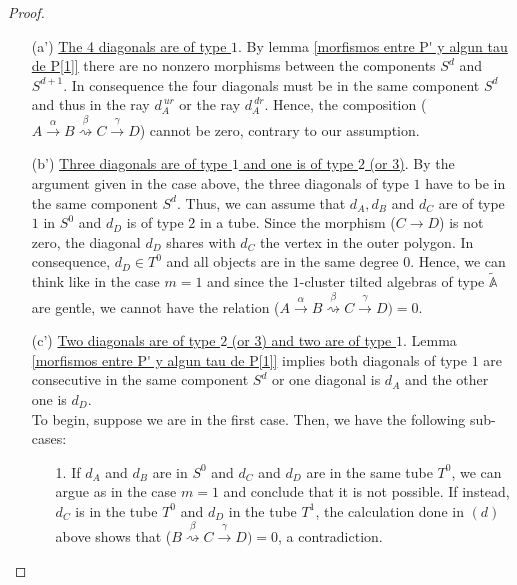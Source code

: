 \documentclass{amsart}
\theoremstyle{plain}
\theoremstyle{definition}
\begin{document}
\begin{proof}
\begin{itemize}
  \item [(a')] \underline{The 4 diagonals are of type $1$}. By lemma \ref{morfismos entre P' y algun tau de P[1]} there are no nonzero morphisms between the components $S^d$ and $S^{d+1}$. In consequence the four  diagonals must be in the same component  $S^d$ and thus in the ray $d_A^{ \ ur}$ or the ray $d_A^{ \ dr}$. Hence, the composition ($A\stackrel{\alpha}{\rightarrow} B \stackrel{\beta} {\rightsquigarrow} C\stackrel {\gamma}{\rightarrow} D$) cannot be zero, contrary to our assumption. \\

  \item [(b')] \underline{Three diagonals are of type $1$ and one is of type $2$ (or 3)}. By the argument given in the case above, the three  diagonals of type $1$ have to be in the same component $S^d$. Thus, we can assume that $d_A, d_B$ and $d_C$ are of type $1$ in $S^0$ and $d_D$ is of type $2$ in a  tube. Since the morphism ($C\rightarrow D$) is not zero, the diagonal $d_D$ shares with $d_C$ the vertex in the outer polygon. In consequence, $d_D\in T^0$ and all objects are in the same degree $0$. Hence, we can think like in the case $m=1$ and since the  $1$-cluster tilted algebras of type $\widetilde{\mathbb{A}}$ are gentle, we cannot have the  relation ($A\stackrel{\alpha}{\rightarrow} B \stackrel{\beta} {\rightsquigarrow} C\stackrel {\gamma}{\rightarrow} D )=0$.\\

  \item [(c')] \underline{Two diagonals are of type $2$ (or 3) and two are of type $1$}. Lemma \ref{morfismos entre P' y algun tau de P[1]} implies both diagonals of type $1$ are consecutive in the same component $S^d$ or one diagonal is $d_A$ and the other one is  $d_D$. \\
       To begin, suppose we are in the first case. Then, we have the following sub-cases:

      \begin{itemize}
        \item [1.] If $d_A$ and $d_B$ are in $S^0$ and $d_C$ and $d_D$ are in the same tube $T^0$, we can argue as in the case $m=1$ and conclude that it is not possible. If instead, $d_C$ is in the tube $T^0$ and $d_D$ in the tube $T^1$, the calculation done in  $(d)$ above shows that ($B \stackrel{\beta} {\rightsquigarrow} C\stackrel {\gamma}{\rightarrow} D) =0$, a contradiction.\\


\end{itemize}
\end{itemize}
\end{proof}
\end{document}
